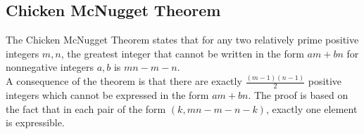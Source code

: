 \subsection{Chicken McNugget Theorem}

The Chicken McNugget Theorem states that for any two relatively prime positive integers $m, n$, the greatest integer that cannot be written in the form $am + bn$ for nonnegative integers $a, b$ is $mn-m-n$.\\
\hfill \break
A consequence of the theorem is that there are exactly $\frac{(m - 1)(n - 1)}{2}$ positive integers which cannot be expressed in the form $am + bn$. The proof is based on the fact that in each pair of the form $(k, mn-m-n-k)$, exactly one element is expressible.